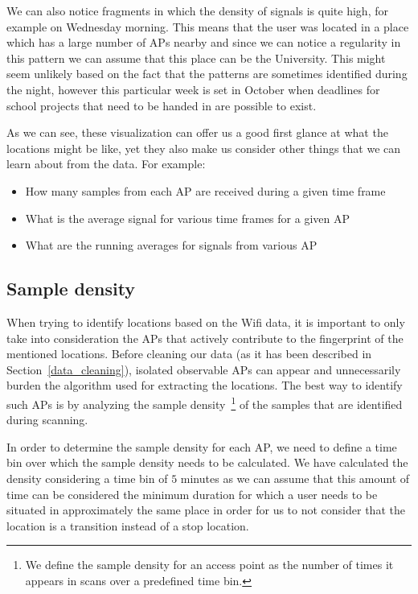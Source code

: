 We can also notice fragments in which the density of signals is quite high, for
example on Wednesday morning. This means that the user was located in a place
which has a large number of APs nearby and since we can notice a regularity in
this pattern we can assume that this place can be the University. This might
seem unlikely based on the fact that the patterns are sometimes identified
during the night, however this particular week is set in October when deadlines
for school projects that need to be handed in are possible to exist.

As we can see, these visualization can offer us a good first glance at what the
locations might be like, yet they also make us consider other things that we can
learn about from the data. For example:
\begin{itemize}
  \item How many samples from each AP are received during a given time frame
  \item What is the average signal for various time frames for a given AP
  \item What are the running averages for signals from various AP
\end{itemize}

\subsection{Sample density}

When trying to identify locations based on the Wifi data, it is important to
only take into consideration the APs that actively contribute to the fingerprint
of the mentioned locations. Before cleaning our data (as it has been described
in Section~\ref{data_cleaning}), isolated observable APs can appear and
unnecessarily burden the algorithm used for extracting the locations.
The best way to identify such APs is by analyzing the sample
density~\footnote{We define the sample density for an access point as the number
of times it appears in scans over a predefined time bin.} of the samples that
are identified during scanning.

In order to determine the sample density for each AP, we need to define a time
bin over which the sample density needs to be calculated. We have calculated the
density considering a time bin of $5$ minutes as we can assume that this amount
of time can be considered the minimum duration for which a user needs to be
situated in approximately the same place in order for us to not consider that
the location is a transition instead of a stop location.

